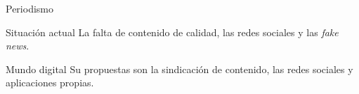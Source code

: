 \documentclass[12pt]{beamer}
\begin{document}
		\begin{frame}{Periodismo}
			\begin{block}{Situación actual}
				La falta de contenido de calidad, las redes sociales y las \textit{fake news}.
			\end{block}
			\begin{block}{Mundo digital}
				Su propuestas son la sindicación de contenido, las redes sociales y aplicaciones propias.
			\end{block}
		\end{frame}
\end{document}
